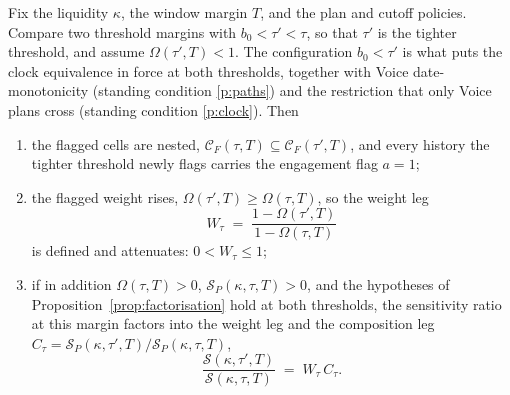 \begin{lemma}
\label{lem:threshold-weight}
Fix the liquidity $\kappa$, the window margin $T$, and the plan and cutoff policies. Compare two
threshold margins with $b_0 < \tau' < \tau$, so that $\tau'$ is the tighter threshold, and assume
$\Omega(\tau',T) < 1$. The configuration $b_0 < \tau'$ is what puts the clock equivalence in force
at both thresholds, together with Voice date-monotonicity (standing condition \ref{p:paths}) and
the restriction that only Voice plans cross (standing condition \ref{p:clock}). Then
\begin{enumerate}[label=(\roman*),leftmargin=2.4em,itemsep=3pt]
\item the flagged cells are nested, $\mathcal C_F(\tau,T) \subseteq \mathcal C_F(\tau',T)$, and
every history the tighter threshold newly flags carries the engagement flag $a=1$;
\item the flagged weight rises, $\Omega(\tau',T) \ge \Omega(\tau,T)$, so the weight leg
\begin{equation}
\label{eq:threshold-weight-leg}
W_\tau \;=\; \frac{1-\Omega(\tau',T)}{1-\Omega(\tau,T)}
\end{equation}
is defined and attenuates: $0 < W_\tau \le 1$;
\item if in addition $\Omega(\tau,T) > 0$, $\mathcal S_P(\kappa,\tau,T) > 0$, and the hypotheses of
Proposition~\ref{prop:factorisation} hold at both thresholds, the sensitivity
ratio at this margin factors into the weight leg and the composition leg
$C_\tau = \mathcal S_P(\kappa,\tau',T)/\mathcal S_P(\kappa,\tau,T)$,
\begin{equation}
\label{eq:threshold-ratio}
\frac{\mathcal S(\kappa,\tau',T)}{\mathcal S(\kappa,\tau,T)} \;=\; W_\tau\,C_\tau .
\end{equation}
\end{enumerate}
\end{lemma}

